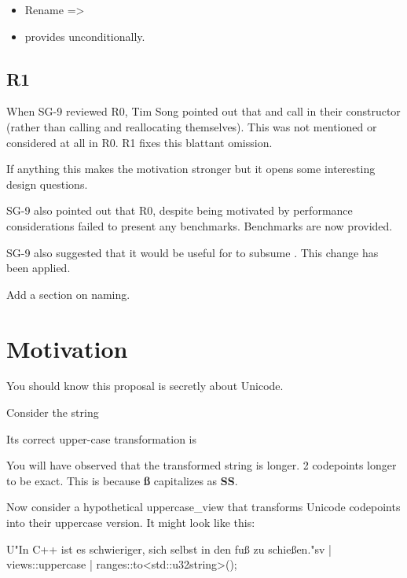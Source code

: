 \documentclass{wg21}
\begin{document}
\begin{itemize}
\item Rename  => 
\item {} provides  unconditionally.
\end{itemize}

\subsection{R1}

When SG-9 reviewed R0, Tim Song pointed out that  and  call  in their constructor (rather than calling  and reallocating themselves).
This was not mentioned or considered at all in R0. R1 fixes this blattant omission.

If anything this makes the motivation stronger but it opens some interesting design questions.

SG-9 also pointed out that R0, despite being motivated by performance considerations failed to present any benchmarks. Benchmarks are now provided.

SG-9 also suggested that it would be useful for  to subsume .
This change has been applied.

Add a section on naming.

\section{Motivation}

You should know this proposal is secretly about Unicode.

Consider the string


Its correct upper-case transformation is


You will have observed that the transformed string is longer.
2 codepoints longer to be exact. This is because \textbf{ß} capitalizes as \textbf{SS}.

Now consider a hypothetical uppercase_view that transforms Unicode codepoints into their uppercase version.
It might look like this:

\begin{colorblock}
U"In C++ ist es schwieriger, sich selbst in den fuß zu schießen."sv
    | views::uppercase
    | ranges::to<std::u32string>();
\end{colorblock}
\end{document}
